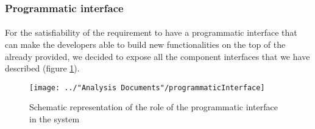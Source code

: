 \subsubsection{Programmatic interface} \label{design:programmaticInterface}
\paragraph{} For the satisfiability of the requirement to have a programmatic interface that can make the developers able to build new functionalities on the top of the already provided, we decided to expose all the component interfaces that we have described (figure \ref{fig:programmaticInterface}).

\begin{figure}[H]
	\centering
	\texttt{[image: ../"Analysis Documents"/programmaticInterface]}
	\caption{Schematic representation of the role of the programmatic interface in the system}
	\label{fig:programmaticInterface}
\end{figure}
